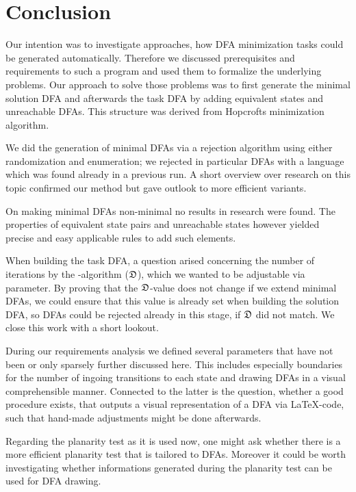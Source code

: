 
\chapter{Conclusion}

Our intention was to investigate approaches, how DFA minimization tasks could be generated automatically. Therefore we discussed prerequisites and requirements to such a program and used them to formalize the underlying problems. Our approach to solve those problems was to first generate the minimal solution DFA and afterwards the task DFA by adding equivalent states and unreachable DFAs. This structure was derived from Hopcrofts minimization algorithm.

We did the generation of minimal DFAs via a rejection algorithm using either randomization and enumeration; we rejected in particular DFAs with a language which was found already in a previous run. A short overview over research on this topic confirmed our method but gave outlook to more efficient variants.

On making minimal DFAs non-minimal no results in research were found. The properties of equivalent state pairs and unreachable states however yielded precise and easy applicable rules to add such elements.

When building the task DFA, a question arised concerning the number of iterations by the \CompDist-algorithm ($\mathfrak{D}$), which we wanted to be adjustable via parameter. By proving that the $\mathfrak{D}$-value does not change if we extend minimal DFAs, we could ensure that this value is already set when building the solution DFA, so DFAs could be rejected already in this stage, if $\mathfrak{D}$ did not match. We close this work with a short lookout.

During our requirements analysis we defined several parameters that have not been or only sparsely further discussed here. This includes especially boundaries for the number of ingoing transitions to each state and drawing DFAs in a visual comprehensible manner. Connected to the latter is the question, whether a good procedure exists, that outputs a visual representation of a DFA via \LaTeX-code, such that hand-made adjustments might be done afterwards.

Regarding the planarity test as it is used now, one might ask whether there is a more efficient planarity test that is tailored to DFAs. Moreover it could be worth investigating whether informations generated during the planarity test can be used for DFA drawing.

